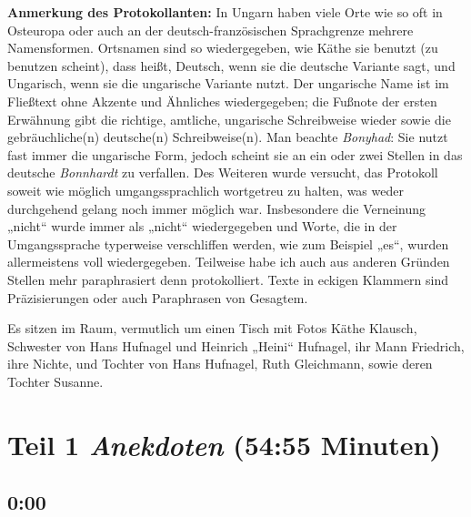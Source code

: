 \documentclass[ngerman,]{article}
\begin{document}
\begin{multicols}{2}
\textbf{Anmerkung des Protokollanten:} In Ungarn haben viele Orte wie so
oft in Osteuropa oder auch an der deutsch-französischen Sprachgrenze
mehrere Namensformen. Ortsnamen sind so wiedergegeben, wie Käthe sie
benutzt (zu benutzen scheint), dass heißt, Deutsch, wenn sie die
deutsche Variante sagt, und Ungarisch, wenn sie die ungarische Variante
nutzt. Der ungarische Name ist im Fließtext ohne Akzente und Ähnliches
wiedergegeben; die Fußnote der ersten Erwähnung gibt die richtige,
amtliche, ungarische Schreibweise wieder sowie die gebräuchliche(n)
deutsche(n) Schreibweise(n). Man beachte \emph{Bonyhad}: Sie nutzt fast
immer die ungarische Form, jedoch scheint sie an ein oder zwei Stellen
in das deutsche \emph{Bonnhardt} zu verfallen. Des Weiteren wurde
versucht, das Protokoll soweit wie möglich umgangssprachlich wortgetreu
zu halten, was weder durchgehend gelang noch immer möglich war.
Insbesondere die Verneinung „nicht“ wurde immer als „nicht“
wiedergegeben und Worte, die in der Umgangssprache typerweise
verschliffen werden, wie zum Beispiel „es“, wurden allermeistens voll
wiedergegeben. Teilweise habe ich auch aus anderen Gründen Stellen mehr
paraphrasiert denn protokolliert. Texte in eckigen Klammern sind
Präzisierungen oder auch Paraphrasen von Gesagtem.

Es sitzen im Raum, vermutlich um einen Tisch mit Fotos Käthe Klausch,
Schwester von Hans Hufnagel und Heinrich „Heini“ Hufnagel, ihr Mann
Friedrich, ihre Nichte, und Tochter von Hans Hufnagel, Ruth Gleichmann,
sowie deren Tochter Susanne.

\hypertarget{anekdoten}{%
\section{\texorpdfstring{Teil 1 \emph{Anekdoten} (54:55
Minuten)}{Teil 1 Anekdoten (54:55 Minuten)}}\label{anekdoten}}

\hypertarget{section}{%
\subsection{0:00}\label{section}}


\end{multicols}
\end{document}
